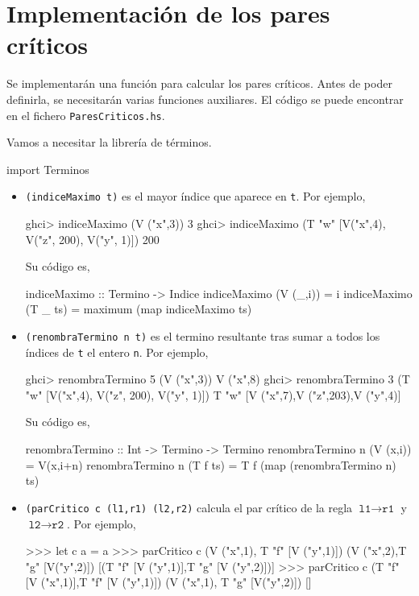 \section{Implementación de los pares críticos}

Se implementarán una función para calcular los pares críticos. Antes
de poder definirla, se necesitarán varias funciones auxiliares. El
código se puede encontrar en el fichero \texttt{ParesCriticos.hs}.

Vamos a necesitar la librería de términos.
\begin{codigo}
import Terminos
\end{codigo}

\begin{itemize}
\item \texttt{(indiceMaximo t)} es el mayor índice que aparece en
  \texttt{t}. Por ejemplo,
\begin{sesion}
ghci> indiceMaximo (V ("x",3))
3
ghci> indiceMaximo (T "w" [V("x",4), V("z", 200), V("y", 1)])
200
\end{sesion}

Su código es,

\begin{codigo}
indiceMaximo :: Termino -> Indice
indiceMaximo (V (_,i)) = i
indiceMaximo (T _ ts) = maximum (map indiceMaximo ts)
\end{codigo}

\item \texttt{(renombraTermino n t)} es el termino resultante tras sumar a
  todos los índices de \texttt{t} el entero \texttt{n}. Por ejemplo,
\begin{sesion}
ghci> renombraTermino 5 (V ("x",3)) 
V ("x",8)
ghci> renombraTermino 3 (T "w" [V("x",4), V("z", 200), V("y", 1)])
T "w" [V ("x",7),V ("z",203),V ("y",4)]
\end{sesion}

Su código es,

\begin{codigo}
renombraTermino :: Int -> Termino -> Termino
renombraTermino n (V (x,i)) = V(x,i+n)
renombraTermino n (T f ts) = T f (map (renombraTermino n) ts)
\end{codigo}

\item \texttt{(parCritico c (l1,r1) (l2,r2)} calcula el par crítico de la
  regla $\texttt{l1} \rightarrow \texttt{r1}$ y
  $\texttt{l2} \rightarrow \texttt{r2}$. Por ejemplo,
\begin{sesion}
>>> let c a = a
>>> parCritico c (V ("x",1), T "f" [V ("y",1)])
                 (V ("x",2),T "g" [V("y",2)])
[(T "f" [V ("y",1)],T "g" [V ("y",2)])]
>>> parCritico c (T "f" [V ("x",1)],T "f" [V ("y",1)])
               (V ("x",1), T "g" [V("y",2)])
[]
\end{sesion}


\end{itemize}
